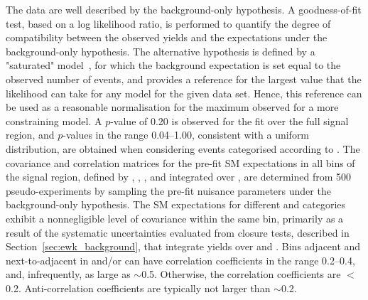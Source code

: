The data are well described by the background-only hypothesis. 
A goodness-of-fit test, based on a log likelihood ratio, is performed
to quantify the degree of compatibility between the observed yields
and the expectations under the background-only hypothesis. The
alternative hypothesis is defined by a "saturated"
model~\cite{sat-llk}, for which the background expectation is set
equal to the observed number of events, and provides a reference for
the largest value that the likelihood can take for any model for the
given data set. Hence, this reference can be used as a reasonable
normalisation for the maximum observed for a more constraining
model. A $p$-value of 0.20 is observed for the fit over the full
signal region, and $p$-values in the range 0.04--1.00, consistent with
a uniform distribution, are obtained when considering events
categorised according to \njet.
The covariance and correlation matrices for the pre-fit SM
expectations in all bins of the signal region, defined by \njet, \nb,
\scalht, and integrated over \HTmiss, are determined from 500
pseudo-experiments by sampling the pre-fit nuisance parameters under
the background-only hypothesis. The SM expectations for different
\njet and \nb categories exhibit a nonnegligible level of covariance
within the same \scalht bin, primarily as a result of the systematic
uncertainties evaluated from closure tests, described in
Section~\ref{sec:ewk_background}, that integrate yields over \njet and
\nb. Bins adjacent and next-to-adjacent in \njet and/or \nb can have
correlation coefficients in the range 0.2--0.4, and, infrequently, as
large as $\sim$0.5. Otherwise, the correlation coefficients are
$<$0.2. Anti-correlation coefficients are typically not larger than
$\sim$0.2.

%
%
%

